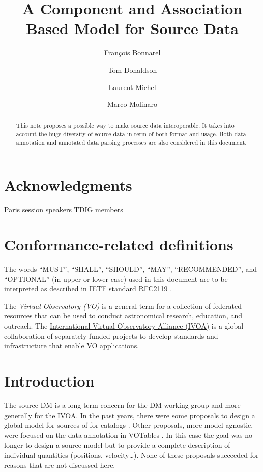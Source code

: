 \documentclass[11pt,a4paper]{ivoa}
\title{A Component and Association Based Model for Source Data}
\author[http://wiki.ivoa.net/twiki/bin/view/IVOA/FrancoisBonnarel]{François Bonnarel}
\author[http://wiki.ivoa.net/twiki/bin/view/IVOA/TomDonaldson]{Tom Donaldson}
\author[http://wiki.ivoa.net/twiki/bin/view/IVOA/LaurentMichel]{Laurent Michel}
\author[http://wiki.ivoa.net/twiki/bin/view/IVOA/MarcoMolinaro]{Marco Molinaro}
\begin{document}
\begin{abstract}
This note proposes a possible way to make source data interoperable. It takes into account the huge diversity of source data in term of both format and usage. Both data annotation and annotated data parsing processes are also considered in this document.
\end{abstract}


\section*{Acknowledgments}

Paris session speakers TDIG members

\section*{Conformance-related definitions}

The words ``MUST'', ``SHALL'', ``SHOULD'', ``MAY'', ``RECOMMENDED'', and
``OPTIONAL'' (in upper or lower case) used in this document are to be
interpreted as described in IETF standard RFC2119 \citep{std:RFC2119}.

The \emph{Virtual Observatory (VO)} is a
general term for a collection of federated resources that can be used
to conduct astronomical research, education, and outreach.
The \href{http://www.ivoa.net}{International
Virtual Observatory Alliance (IVOA)} is a global
collaboration of separately funded projects to develop standards and
infrastructure that enable VO applications.


\section{Introduction}

The source DM is a long term concern for the DM working group and more generally for the IVOA.
In the past years, there were some proposals to design a global model for sources \citep{wd:jesusdm} of for catalogs \citep{wd:catalog}.
Other proposals, more model-agnostic, were focused on the data annotation in VOTables \citep{note:stcvot} \citep{note:seb}. In this case the goal was no longer to design a source model but to provide a complete description of  individual quantities (positions, velocity…).
None of these proposals succeeded for reasons that are not discussed here. 
\end{document}

